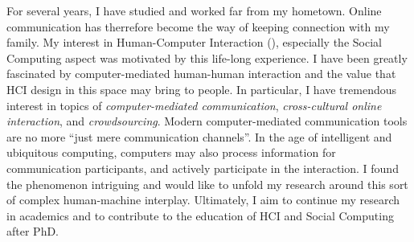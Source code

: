 %

\noindent
For several years, I have studied and worked far from my hometown. 
Online communication has therrefore become the way of keeping connection with my family.
My interest in Human-Computer Interaction (), especially the Social Computing aspect was motivated by this life-long experience.
I have been greatly fascinated by computer-mediated human-human interaction and the value that HCI design in this space may bring to people. 
In particular, I have tremendous interest in topics of \emph{computer-mediated communication}, 
\emph{cross-cultural online interaction}, and \emph{crowdsourcing}. 
Modern computer-mediated communication tools are no more ``just mere communication channels''. 
In the age of intelligent and ubiquitous computing, computers may also process information for communication participants, 
and actively participate in the interaction. 
I found the phenomenon intriguing and would like to unfold my research around this sort of complex human-machine interplay.
Ultimately, I aim to continue my research in academics and to contribute to the education of HCI and Social Computing after PhD.\\


 




